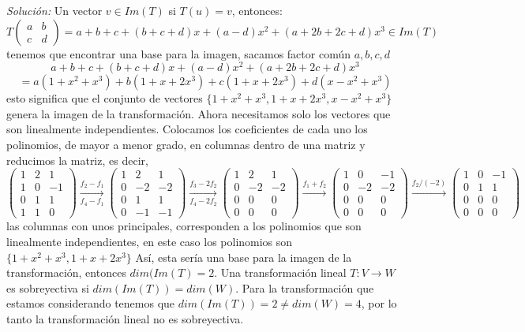 \documentclass{article}
\newenvironment{solution}
    {\textit{Solución:}}
    {}
\begin{document}
\begin{solution}
Un vector $v\in Im(T)$ si $T(u) = v$, entonces:
\[
T  \begin{pmatrix} a & b \\ c & d \end{pmatrix} = 
a+b+c+(b+c+d)x+(a-d)x^2+(a+2b+2c+d)x^3 \in Im(T)
\]
tenemos que encontrar una base para la imagen, sacamos factor común $a,b,c,d$
\[
a+b+c+(b+c+d)x+(a-d)x^2+(a+2b+2c+d)x^3
\]\[
= a(1+x^2+x^3)+b(1+x+2x^3)+c(1+x+2x^3)+d(x-x^2+x^3)
\]
esto significa que el conjunto de vectores $\{ 1+x^2+x^3, 1+x+2x^3, x-x^2+x^3 \}$ genera la imagen de la transformación. Ahora necesitamos solo los vectores que son linealmente independientes.
Colocamos los coeficientes de cada uno los polinomios, de mayor a menor grado, en columnas dentro de una matriz y reducimos la matriz, es decir,
\[
\begin{pmatrix}
1 & 2 & 1 \\
1 & 0 & -1 \\
0 & 1 & 1 \\
1 & 1 & 0
\end{pmatrix} \xrightarrow[f_4-f_1]{f_2-f_1}
\begin{pmatrix}
1 & 2 & 1 \\
0 & -2 & -2 \\
0 & 1 & 1 \\
0 & -1 & -1
\end{pmatrix} \xrightarrow[f_4-2f_2]{f_3-2f_2}
\begin{pmatrix}
1 & 2 & 1 \\
0 & -2 & -2 \\
0 & 0 & 0 \\
0 & 0 & 0
\end{pmatrix} \xrightarrow{f_1+f_2}
\begin{pmatrix}
1 & 0 & -1 \\
0 & -2 & -2 \\
0 & 0 & 0 \\
0 & 0 & 0
\end{pmatrix} \xrightarrow{f_2/(-2)}
\begin{pmatrix}
1 & 0 & -1 \\
0 & 1 & 1 \\
0 & 0 & 0 \\
0 & 0 & 0
\end{pmatrix}
\]
las columnas con unos principales, corresponden a los polinomios que son linealmente independientes, en este caso los polinomios son $\{ 1+x^2+x^3, 1+x+2x^3 \}$ Así, esta sería una base para la imagen de la transformación, entonces $dim(Im(T)=2$.
Una transformación lineal $T:V\to W$ es sobreyectiva si $dim(Im(T))=dim(W)$. Para la transformación que estamos considerando tenemos que $dim(Im(T))=2 \neq dim(W) = 4$, por lo tanto la transformación lineal no es sobreyectiva.
\end{solution}
\end{document}
